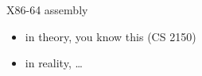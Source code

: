 \begin{frame}{X86-64 assembly}
    \begin{itemize}
    \item in theory, you know this (CS 2150)
    \item in reality, \ldots{}
    \end{itemize}
\end{frame}
